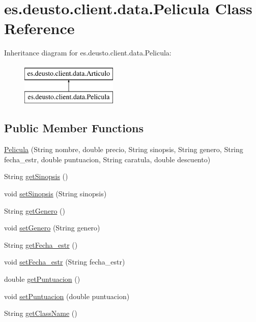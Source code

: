 \hypertarget{classes_1_1deusto_1_1client_1_1data_1_1_pelicula}{}\section{es.\+deusto.\+client.\+data.\+Pelicula Class Reference}
\label{classes_1_1deusto_1_1client_1_1data_1_1_pelicula}
Inheritance diagram for es.\+deusto.\+client.\+data.\+Pelicula\+:\begin{figure}[H]
\begin{center}
\leavevmode
\includegraphics[height=2.000000cm]{classes_1_1deusto_1_1client_1_1data_1_1_pelicula}
\end{center}
\end{figure}
\subsection*{Public Member Functions}
\begin{DoxyCompactItemize}
\item 
\mbox{\hyperlink{classes_1_1deusto_1_1client_1_1data_1_1_pelicula_adafcafb89af41908cd13edc4d79595db}{Pelicula}} (String nombre, double precio, String sinopsis, String genero, String fecha\+\_\+estr, double puntuacion, String caratula, double descuento)
\item 
String \mbox{\hyperlink{classes_1_1deusto_1_1client_1_1data_1_1_pelicula_a887a811206340983b6778448a487d41d}{get\+Sinopsis}} ()
\item 
void \mbox{\hyperlink{classes_1_1deusto_1_1client_1_1data_1_1_pelicula_abaddc8274ccaa6f62f909d93e7cd99a9}{set\+Sinopsis}} (String sinopsis)
\item 
String \mbox{\hyperlink{classes_1_1deusto_1_1client_1_1data_1_1_pelicula_a328975e00629f73c6a9b8b8714844afc}{get\+Genero}} ()
\item 
void \mbox{\hyperlink{classes_1_1deusto_1_1client_1_1data_1_1_pelicula_aa5af2ff51200f68ea9554b072fcabb15}{set\+Genero}} (String genero)
\item 
String \mbox{\hyperlink{classes_1_1deusto_1_1client_1_1data_1_1_pelicula_a73e8fc2eebdeb6ab0dad7d094159bca4}{get\+Fecha\+\_\+estr}} ()
\item 
void \mbox{\hyperlink{classes_1_1deusto_1_1client_1_1data_1_1_pelicula_a21795fe1bed077d7cb92490e7c08dcec}{set\+Fecha\+\_\+estr}} (String fecha\+\_\+estr)
\item 
double \mbox{\hyperlink{classes_1_1deusto_1_1client_1_1data_1_1_pelicula_a9d6cde6dc871a808c0311a9111805b63}{get\+Puntuacion}} ()
\item 
void \mbox{\hyperlink{classes_1_1deusto_1_1client_1_1data_1_1_pelicula_ab4e026bb1ed2ac2ca5a345e4fa3c4d11}{set\+Puntuacion}} (double puntuacion)
\item 
String \mbox{\hyperlink{classes_1_1deusto_1_1client_1_1data_1_1_pelicula_aad7743ea7c010d45c64be8984161e09c}{get\+Class\+Name}} ()
\end{DoxyCompactItemize}


